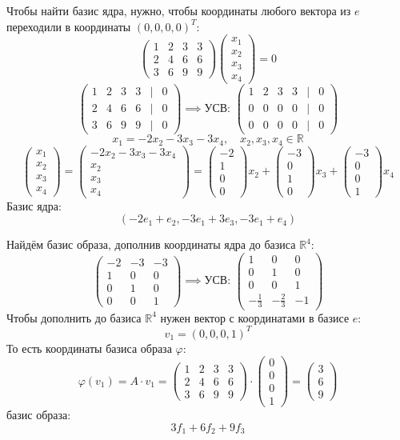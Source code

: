 \documentclass[a4paper]{article}
\newcommand{\mat}[1]{\begin{pmatrix} #1 \end{pmatrix}}
\renewcommand{\phi}{\varphi}
\newcommand{\RR}{\mathbb{R}}
\begin{document}
\begin{enumerate}
    Чтобы найти базис ядра, нужно, чтобы координаты любого вектора из $e$ переходили в координаты $(0, 0, 0, 0)^{T}$:
    $$\begin{pmatrix} 1 & 2 & 3 & 3 \\ 2 & 4 & 6 & 6 \\ 3 & 6 & 9 & 9 \end{pmatrix}\mat{x_1 \\ x_2 \\ x_3 \\ x_4} = 0$$
    $$\begin{pmatrix} 1 & 2 & 3 & 3 & | & 0 \\ 2 & 4 & 6 & 6 & | & 0\\ 3 & 6 & 9 & 9 & | & 0\end{pmatrix} \implies \text{УСВ: }
    \begin{pmatrix}
        1 & 2 & 3 & 3 & | & 0 \\
        0 & 0 & 0 & 0 & | & 0 \\
        0 & 0 & 0 & 0 & | & 0
    \end{pmatrix}$$
    $$x_1 = -2x_2-3x_3-3x_4, \quad x_2, x_3, x_4 \in \RR$$
    $$\mat{x_1 \\ x_2 \\ x_3 \\x_4} = \mat{-2x_2-3x_3-3x_4 \\ x_2 \\ x_3 \\x_4} = \mat{-2\\1\\0\\0}x_2+\mat{-3\\0\\1\\0}x_3+\mat{-3\\0\\0\\1}x_4$$
    Базис ядра:
    $$(-2e_1+e_2, -3e_1+3e_3, -3e_1+e_4)$$

    Найдём базис образа, дополнив координаты ядра до базиса $\RR^4$:
    $$\mat{-2 & -3 & -3 \\ 1 & 0 & 0 \\ 0 & 1 & 0 \\ 0 & 0 & 1} \implies \text{УСВ: } \mat{1 & 0 & 0 \\
    0 & 1 & 0 \\
    0 & 0 & 1 \\
    -\frac{1}{3} & -\frac{2}{3} & -1}$$
    Чтобы дополнить до базиса $\RR^4$ нужен вектор с координатами в базисе $e$:
    $$v_1 = (0, 0, 0, 1)^T$$
    То есть координаты базиса образа $\phi$:
    $$\phi(v_1) = A\cdot v_1 = \begin{pmatrix} 1 & 2 & 3 & 3 \\ 2 & 4 & 6 & 6 \\ 3 & 6 & 9 & 9 \end{pmatrix} \cdot \mat{0\\0\\0\\1}  = \mat{3\\6\\9}$$
    базис образа:
    $$3f_1 + 6f_2+9f_3$$\\


\end{enumerate}
\end{document}
